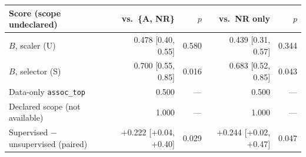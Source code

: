 \begin{tabular}{lrrrr}\toprule
Score (scope undeclared) & vs.\ \{A, NR\} & $p$ & vs.\ NR only & $p$\\\midrule
$B$, scaler (U) & 0.478 [0.40, 0.55] & 0.580 & 0.439 [0.31, 0.57] & 0.344\\
$B$, selector (S) & 0.700 [0.55, 0.85] & 0.016 & 0.683 [0.52, 0.85] & 0.043\\
Data-only \texttt{assoc\_top} & 0.500 & --- & 0.500 & ---\\
Declared scope (not available) & 1.000 & --- & 1.000 & ---\\
\midrule Supervised $-$ unsupervised (paired) & +0.222 [+0.04, +0.40] & 0.029 & +0.244 [+0.02, +0.47] & 0.047\\
\bottomrule\end{tabular}
